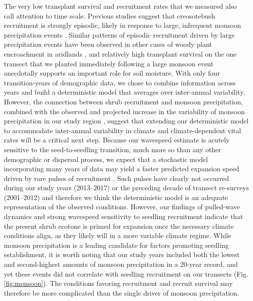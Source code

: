 \documentclass[11pt]{article}\usepackage[]{graphicx}\usepackage[]{color}
\begin{document}
The very low transplant survival and recruitment rates that we measured also call attention to time scale. 
Previous studies suggest that creosotebush recruitment is strongly episodic, likely in response to large, infrequent monsoon precipitation events \citep{moreno2016seed,allen2008allometry,boyd1983postdispersal}.
Similar patterns of episodic recruitment driven by large precipitation events have been observed in other cases of woody plant encroachment in aridlands \citep{harrington1991effects,weber2022woody}, and relatively high transplant survival on the one transect that we planted immediately following a large monsoon event anecdotally supports an important role for soil moisture. 
With only four transition-years of demographic data, we chose to combine information across years and build a deterministic model that averages over inter-annual variability.
However, the connection between shrub recruitment and monsoon precipitation, combined with the observed and projected increase in the variability of monsoon precipitation in our study region \citep{petrie2014regional,rudgers2018climate}, suggest that extending our deterministic model to accommodate inter-annual variability in climate and climate-dependent vital rates will be a critical next step. 
Because our wavespeed estimate is acutely sensitive to the seed-to-seedling transition, much more so than any other demographic or dispersal process, we expect that a stochastic model incorporating many years of data may yield a faster predicted expansion speed driven by rare pulses of recruitment \citep{ellner2012temporally}. 
Such pulses have clearly not occurred during our study years (2013--2017) or the preceding decade of transect re-surveys (2001--2012) and therefore we think the deterministic model is an adequate representation of the observed conditions. 
However, our findings of pulled-wave dynamics and strong wavespeed sensitivity to seedling recruitment indicate that the present shrub ecotone is primed for expansion once the necessary climate conditions align, as they likely will in a more variable climate regime.
While monsoon precipitation is a leading candidate for factors promoting seedling establishment, it is worth noting that our study years included both the lowest and second-highest amounts of monsoon precipitation in a 20-year record, and yet these events did not correlate with seedling recruitment on our transects (Fig. \ref{fig:monsoon}). 
The conditions favoring recruitment and recruit survival may therefore be more complicated than the single driver of monsoon precipitation. 
\end{document}
